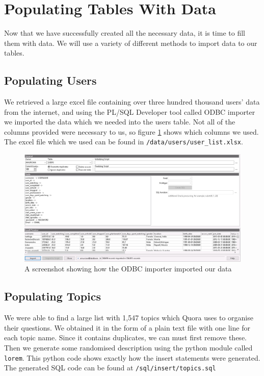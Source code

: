 \section{Populating Tables With Data}

Now that we have successfully created all the necessary data, it is time to fill them with data. We will use a variety of different methods to import data to our tables.

\subsection{Populating Users}

We retrieved a large excel file containing over three hundred thousand users' data from the internet, and using the PL/SQL Developer tool called ODBC importer we imported the data which we needed into the users table. Not all of the columns provided were necessary to us, so figure \ref{users-odbc} shows which columns we used. The excel file which we used can be found in \verb`/data/users/user_list.xlsx`.

\begin{figure}[hbtp]
	\centering
	\includegraphics[width=\linewidth]{images/users_odbc.jpeg}
	\caption{A screenshot showing how the ODBC importer imported our data}
	\label{users-odbc}
\end{figure}

\subsection{Populating Topics}

We were able to find a large list with 1,547 topics which Quora uses to organise their questions. We obtained it in the form of a plain text file with one line for each topic name. Since it contains duplicates, we can must first remove these. Then we generate some randomised description using the python module called \verb`lorem`. This python code shows exactly how the insert statements were generated. The generated SQL code can be found at \verb`/sql/insert/topics.sql`

